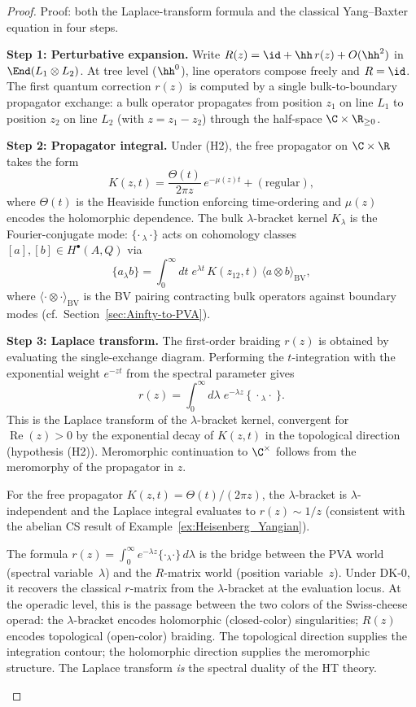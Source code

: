 \begin{proof}
Proof: both the Laplace-transform formula and the classical Yang--Baxter equation in four steps.

\medskip
\noindent\textbf{Step 1: Perturbative expansion.}
Write $R(z) = \id + \hh\, r(z) + O(\hh^2)$ in $\End(L_1 \otimes L_2)$. At tree level ($\hh^0$), line operators compose freely and $R = \id$. The first quantum correction $r(z)$ is computed by a single bulk-to-boundary propagator exchange: a bulk operator propagates from position $z_1$ on line $L_1$ to position $z_2$ on line $L_2$ (with $z = z_1 - z_2$) through the half-space $\C \times \R_{\geq 0}$.

\medskip
\noindent\textbf{Step 2: Propagator integral.}
Under (H2), the free propagator on $\C \times \R$ takes the form
\[
K(z,t) = \frac{\Theta(t)}{2\pi z}\, e^{-\mu(z) t} + (\text{regular}),
\]
where $\Theta(t)$ is the Heaviside function enforcing time-ordering and $\mu(z)$ encodes the holomorphic dependence. The bulk $\lambda$-bracket kernel $K_\lambda$ is the Fourier-conjugate mode: $\{\cdot\,{}_\lambda\,\cdot\}$ acts on cohomology classes $[a], [b] \in H^\bullet(A,Q)$ via
\[
\{a_\lambda b\} = \int_0^\infty dt\; e^{\lambda t}\, K(z_{12}, t)\, \langle a \otimes b \rangle_{\mathrm{BV}},
\]
where $\langle \cdot \otimes \cdot \rangle_{\mathrm{BV}}$ is the BV pairing contracting bulk operators against boundary modes (cf.\ Section~\ref{sec:Ainfty-to-PVA}).

\medskip
\noindent\textbf{Step 3: Laplace transform.}
The first-order braiding $r(z)$ is obtained by evaluating the single-exchange diagram. Performing the $t$-integration with the exponential weight $e^{-zt}$ from the spectral parameter gives
\[
r(z) = \int_0^\infty d\lambda\; e^{-\lambda z}\, \{\ \cdot{}_\lambda \cdot\ \}.
\]
This is the Laplace transform of the $\lambda$-bracket kernel, convergent for $\operatorname{Re}(z) > 0$ by the exponential decay of $K(z,t)$ in the topological direction (hypothesis (H2)). Meromorphic continuation to $\C^\times$ follows from the meromorphy of the propagator in $z$.

For the free propagator $K(z,t) = \Theta(t)/(2\pi z)$, the $\lambda$-bracket is $\lambda$-independent and the Laplace integral evaluates to $r(z) \sim 1/z$ (consistent with the abelian CS result of Example~\ref{ex:Heisenberg_Yangian}).

\begin{remark}
The formula $r(z) = \int_0^\infty e^{-\lambda z} \{\cdot{}_\lambda \cdot\}\, d\lambda$ is the bridge between the PVA world (spectral variable~$\lambda$) and the $R$-matrix world (position variable~$z$). Under DK-0, it recovers the classical $r$-matrix from the $\lambda$-bracket at the evaluation locus. At the operadic level, this is the passage between the two colors of the Swiss-cheese operad: the $\lambda$-bracket encodes holomorphic (closed-color) singularities; $R(z)$ encodes topological (open-color) braiding. The topological direction supplies the integration contour; the holomorphic direction supplies the meromorphic structure. The Laplace transform \emph{is} the spectral duality of the HT theory.
\end{remark}


\end{proof}
